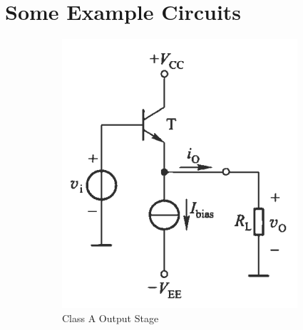 \section{Some Example Circuits}

\begin{figure}[H]
  \centering
  \begin{subfigure}{.4\textwidth}
    \centering
    \includegraphics[width=\linewidth]{figures/Power-A-Ex}
    \caption{Class A Output Stage}
  \end{subfigure}
  \begin{subfigure}{.4\textwidth}
    \centering

\end{subfigure}
\end{figure}
